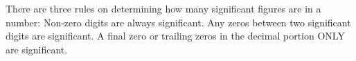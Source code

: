 There are three rules on determining how many significant figures are in a number: Non-zero digits are always significant. Any zeros between two significant digits are significant. A final zero or trailing zeros in the decimal portion ONLY are significant.
